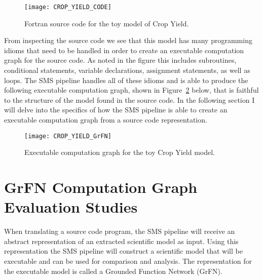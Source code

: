 \begin{figure}[!htbp]
    \label{fig:crop_code}
    \centering
    \texttt{[image: CROP\_YIELD\_CODE]}%
    \caption[Crop Yield Model Source Code]{Fortran source code for the toy model of Crop Yield.}
\end{figure}

From inspecting the source code we see that this model has many programming idioms that need to be handled in order to create an executable computation graph for the source code.
As noted in the figure this includes subroutines, conditional statements, variable declarations, assignment statements, as well as loops.
The SMS pipeline handles all of these idioms and is able to produce the following executable computation graph, shown in Figure~\ref{fig:crop_grfn_cg} below, that is faithful to the structure of the model found in the source code. In the following section I will delve into the specifics of how the SMS pipeline is able to create an executable computation graph from a source code representation.

\begin{figure}[!htbp]
    \label{fig:crop_grfn_cg}
    \centering
    \texttt{[image: CROP\_YIELD\_GrFN]}%
    \caption[Crop Yield Model GrFN CG]{Executable computation graph for the toy Crop Yield model.}
\end{figure}




\section{GrFN Computation Graph Evaluation Studies\label{sec:grfn_eval}}


When translating a source code program, the SMS pipeline will receive an abstract representation of an extracted scientific model as input.
Using this representation the SMS pipeline will construct a scientific model that will be executable and can be used for comparison and analysis.
The representation for the executable model is called a Grounded Function Network (GrFN).

